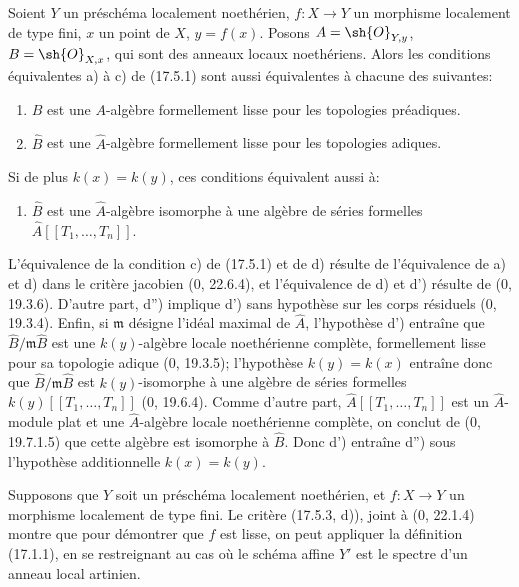 \begin{proposition}[17.5.3]
\label{IV.17.5.3}
Soient $Y$ un préschéma localement noethérien, $f:X\to Y$ un morphisme localement de type fini, $x$ un point de $X$, $y=f(x)$. Posons $A=\sh{O}_{Y,y}$, $B=\sh{O}_{X,x}$, qui sont des anneaux locaux noethériens. Alors les conditions équivalentes a) à c) de (17.5.1) sont aussi équivalentes à chacune des suivantes:
\begin{enumerate}
  \item[d)] $B$ est une $A$-algèbre formellement lisse pour les topologies préadiques.
  \item[d')] $\widehat B$ est une $\widehat A$-algèbre formellement lisse pour les topologies adiques.
\end{enumerate}
Si de plus $k(x)=k(y)$, ces conditions équivalent aussi à:
\begin{enumerate}
  \item[d'')] $\widehat B$ est une $\widehat A$-algèbre isomorphe à une algèbre de séries formelles $\widehat A[[T_1,\ldots,T_n]]$.
\end{enumerate}
\end{proposition}

L'équivalence de la condition c) de (17.5.1) et de d) résulte de l'équivalence de a) et d) dans le critère jacobien (0, 22.6.4), et l'équivalence de d) et d') résulte de (0, 19.3.6). D'autre part, d'') implique d') sans hypothèse sur les corps résiduels (0, 19.3.4). Enfin, si $\mathfrak m$ désigne l'idéal maximal de $\widehat A$, l'hypothèse d') entraîne que $\widehat B/\mathfrak m\widehat B$ est une $k(y)$-algèbre locale noethérienne complète, formellement lisse pour sa topologie adique (0, 19.3.5); l'hypothèse $k(y)=k(x)$ entraîne donc que $\widehat B/\mathfrak m\widehat B$ est $k(y)$-isomorphe à une algèbre de séries formelles $k(y)[[T_1,\ldots,T_n]]$ (0, 19.6.4). Comme d'autre part, $\widehat A[[T_1,\ldots,T_n]]$ est un $\widehat A$-module plat et une $\widehat A$-algèbre locale noethérienne complète, on conclut de (0, 19.7.1.5) que cette algèbre est isomorphe à $\widehat B$. Donc d') entraîne d'') sous l'hypothèse additionnelle $k(x)=k(y)$.

\begin{remark}[17.5.4]
\label{IV.17.5.4}
Supposons que $Y$ soit un préschéma localement noethérien, et $f:X\to Y$ un morphisme localement de type fini. Le critère (17.5.3, d)), joint à (0, 22.1.4) montre que pour démontrer que $f$ est lisse, on peut appliquer la définition (17.1.1), en se restreignant au cas où le schéma affine $Y'$ est le spectre d'un anneau local artinien.
\end{remark}

